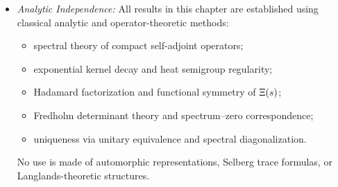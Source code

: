 \begin{itemize}
  \item \textit{Analytic Independence:}  
  All results in this chapter are established using classical analytic and operator-theoretic methods:
  \begin{itemize}
    \item spectral theory of compact self-adjoint operators;
    \item exponential kernel decay and heat semigroup regularity;
    \item Hadamard factorization and functional symmetry of \( \Xi(s) \);
    \item Fredholm determinant theory and spectrum–zero correspondence;
    \item uniqueness via unitary equivalence and spectral diagonalization.
  \end{itemize}
  No use is made of automorphic representations, Selberg trace formulas, or Langlands-theoretic structures.
\end{itemize}
